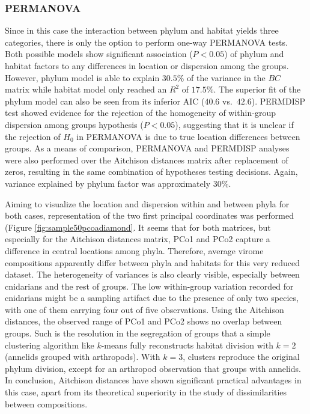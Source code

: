 \documentclass[
  openany]{book}
\begin{document}
\hypertarget{permapilot}{%
\subsubsection{PERMANOVA}\label{permapilot}}

Since in this case the interaction between phylum and habitat yields three categories, there is only the option to perform one-way PERMANOVA tests. Both possible models show significant association (\(P < 0.05\)) of phylum and habitat factors to any differences in location or dispersion among the groups. However, phylum model is able to explain \(30.5\%\) of the variance in the \(BC\) matrix while habitat model only reached an \(R^2\) of \(17.5\%\). The superior fit of the phylum model can also be seen from its inferior AIC (\(40.6\) vs.~\(42.6\)). PERMDISP test showed evidence for the rejection of the homogeneity of within-group dispersion among groups hypothesis (\(P < 0.05\)), suggesting that it is unclear if the rejection of \(H_0\) in PERMANOVA is due to true location differences between groups. As a means of comparison, PERMANOVA and PERMDISP analyses were also performed over the Aitchison distances matrix after replacement of zeros, resulting in the same combination of hypotheses testing decisions. Again, variance explained by phylum factor was approximately \(30\%\).

Aiming to visualize the location and dispersion within and between phyla for both cases, representation of the two first principal coordinates was performed (Figure \ref{fig:sample50pcoadiamond}. It seems that for both matrices, but especially for the Aitchison distances matrix, PCo1 and PCo2 capture a difference in central locations among phyla. Therefore, average virome compositions apparently differ between phyla and habitats for this very reduced dataset. The heterogeneity of variances is also clearly visible, especially between cnidarians and the rest of groups. The low within-group variation recorded for cnidarians might be a sampling artifact due to the presence of only two species, with one of them carrying four out of five observations. Using the Aitchison distances, the observed range of PCo1 and PCo2 shows no overlap between groups. Such is the resolution in the segregation of groups that a simple clustering algorithm like \(k\)-means fully reconstructs habitat division with \(k = 2\) (annelids grouped with arthropods). With \(k = 3\), clusters reproduce the original phylum division, except for an arthropod observation that groups with annelids. In conclusion, Aitchison distances have shown significant practical advantages in this case, apart from its theoretical superiority in the study of dissimilarities between compositions.
\end{document}
